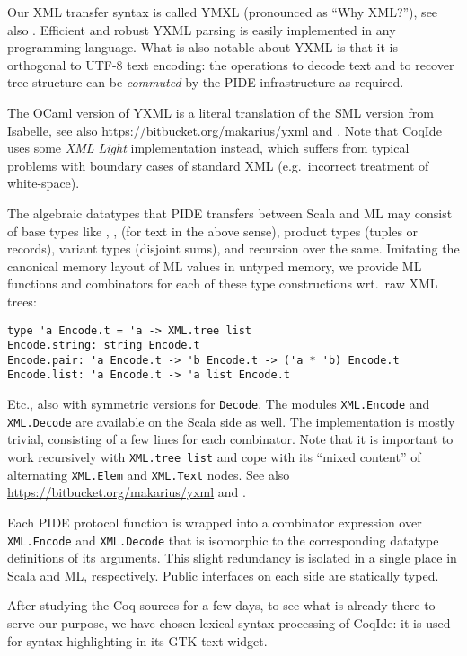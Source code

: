 \begin{isabellebody}
\begin{isamarkuptext}
  Our XML transfer syntax is called YMXL (pronounced as ``Why XML?''),
  see also \cite[\S2.3]{Wenzel:2011:CICM}.  Efficient and robust YXML
  parsing is easily implemented in any programming language.  What is
  also notable about YXML is that it is orthogonal to UTF-8 text
  encoding: the operations to decode text and to recover tree
  structure can be \emph{commuted} by the PIDE infrastructure as
  required.

  The OCaml version of YXML is a literal translation of the SML
  version from Isabelle, see also
  \url{https://bitbucket.org/makarius/yxml} and .
  Note that CoqIde uses some \emph{XML Light} implementation instead,
  which suffers from typical problems with boundary cases of standard
  XML (e.g.\ incorrect treatment of white-space).

    The algebraic datatypes that
  PIDE transfers between Scala and ML may consist of base types like
  , ,  (for text in the
  above sense), product types (tuples or records), variant types
  (disjoint sums), and recursion over the same.  Imitating the
  canonical memory layout of ML values in untyped memory, we provide
  ML functions and combinators for each of these type constructions
  wrt.\ raw XML trees:

{\footnotesize
\begin{verbatim}
type 'a Encode.t = 'a -> XML.tree list
Encode.string: string Encode.t
Encode.pair: 'a Encode.t -> 'b Encode.t -> ('a * 'b) Encode.t
Encode.list: 'a Encode.t -> 'a list Encode.t
\end{verbatim}
}

  \noindent Etc., also with symmetric versions for \verb,Decode,.  The
  modules \verb,XML.Encode, and \verb,XML.Decode, are available on the
  Scala side as well.  The implementation is mostly trivial,
  consisting of a few lines for each combinator.  Note that it is
  important to work recursively with \verb,XML.tree list, and cope
  with its ``mixed content'' of alternating \verb,XML.Elem, and
  \verb,XML.Text, nodes.  See also
  \url{https://bitbucket.org/makarius/yxml} and .

  Each PIDE protocol function is wrapped into a combinator expression
  over \verb,XML.Encode, and \verb,XML.Decode, that is isomorphic to
  the corresponding datatype definitions of its arguments.  This
  slight redundancy is isolated in a single place in Scala and ML,
  respectively.  Public interfaces on each side are statically
  typed.\end{isamarkuptext}\isamarkuptrue {}
\isamarkuptrue \begin{isamarkuptext}After studying the Coq sources for a few days, to see what is
  already there to serve our purpose, we have chosen lexical syntax
  processing of CoqIde: it is used for syntax highlighting in its GTK
  text widget.


\end{isamarkuptext}
\end{isabellebody}
